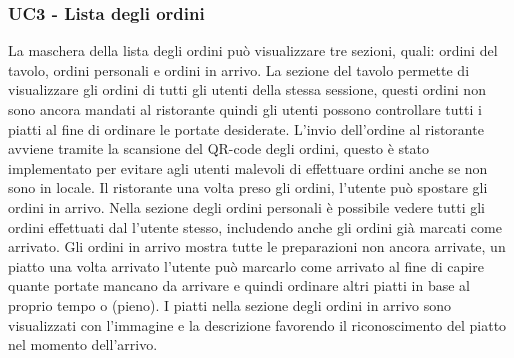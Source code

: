 \subsubsection{UC3 - Lista degli ordini}
La maschera della lista degli ordini può visualizzare tre sezioni, quali: ordini del tavolo, ordini personali e ordini in arrivo.
La sezione del tavolo permette di visualizzare gli ordini di tutti gli utenti della stessa sessione, questi ordini non sono ancora mandati al ristorante quindi gli utenti possono controllare tutti i piatti al fine di ordinare le portate desiderate. L'invio dell'ordine al ristorante avviene tramite la scansione del QR-code degli ordini, questo è stato implementato per evitare agli utenti malevoli di effettuare ordini anche se non sono in locale. Il ristorante una volta preso gli ordini, l'utente può spostare gli ordini in arrivo. Nella sezione degli ordini personali è possibile vedere tutti gli ordini effettuati dal l'utente stesso, includendo anche gli ordini già marcati come arrivato. Gli ordini in arrivo mostra tutte le preparazioni non ancora arrivate, un piatto una volta arrivato l'utente può marcarlo come arrivato al fine di capire quante portate mancano da arrivare e quindi ordinare altri piatti in base al proprio tempo o (pieno). I piatti nella sezione degli ordini in arrivo sono visualizzati con l'immagine e la descrizione favorendo il riconoscimento del piatto nel momento dell'arrivo.
